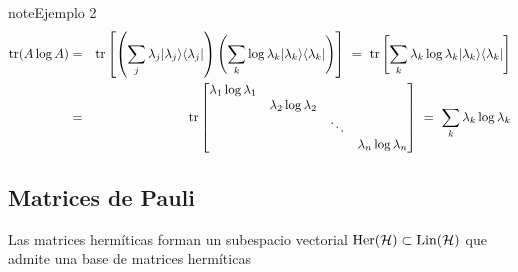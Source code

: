 \documentclass[letterpaper,10pt,english]{jupyterBook}
\newcommand{\bra}[1]{\langle #1|}
\newcommand{\ket}[1]{|#1\rangle}
\newcommand{\Hil}{{\cal H}}
\newcommand{\Lin}{\hbox{Lin}}
\begin{document}
\begin{sphinxadmonition}{note}{Ejemplo 2}
\begin{eqnarray*}
{\rm tr}(A \log A) &=& {\rm tr}\left[\left(\sum_j \lambda_j \ket{\lambda_j}\bra{\lambda_j}\right)\left(\sum_k\log \lambda_k \ket{\lambda_k}\bra{\lambda_k}\right)\right] ~=~  {\rm tr}\left[\sum_k \lambda_k \log\lambda_k \ket{\lambda_k}\bra{\lambda_k} \right] \\ \rule{0mm}{20mm}
&=& {\rm tr} \begin{bmatrix} \lambda_1 \log \lambda_1& &  & \\ &\lambda_2 \log \lambda_2 & &  \\ & & \ddots & \\ & & & \lambda_n \log \lambda_n
\end{bmatrix}
 ~= ~ \sum_k \lambda_k \log \lambda_k \rule{0mm}{8mm}
\end{eqnarray*}\end{sphinxadmonition}


\subsection{Matrices de Pauli}
\label{\detokenize{docs/Part_01_Formalismo/Chapter_01_02_Formalismo_matem_xe1tico/01_03_Operadores_myst:matrices-de-pauli}}
\sphinxAtStartPar
Las matrices hermíticas forman un subespacio vectorial \(\hbox{Her}(\Hil)\subset \Lin(\Hil)\) que admite una base de matrices hermíticas
\end{document}

